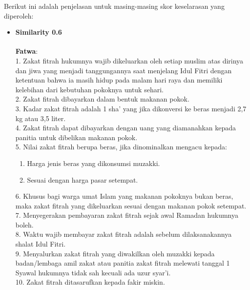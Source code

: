 \documentclass[12pt,a4paper]{article}
\begin{document}
Berikut ini adalah penjelasan untuk masing-masing skor keselarasan yang diperoleh:

\begin{itemize}
    \item \textbf{Similarity 0.6} \\ \\
        \textbf{Fatwa}: \\
        1. Zakat fitrah hukumnya wajib dikeluarkan oleh setiap muslim atas dirinya dan jiwa yang menjadi tanggungannya saat menjelang Idul Fitri dengan ketentuan bahwa ia masih hidup pada malam hari raya dan memiliki kelebihan dari kebutuhan pokoknya untuk sehari. \\
        2. Zakat fitrah dibayarkan dalam bentuk makanan pokok. \\
        3. Kadar zakat fitrah adalah 1 sha' yang jika dikonversi ke beras menjadi 2,7 kg atau 3,5 liter. \\
        4. Zakat fitrah dapat dibayarkan dengan uang yang diamanahkan kepada panitia untuk dibelikan makanan pokok. \\
        5. Nilai zakat fitrah berupa beras, jika dinominalkan mengacu kepada:
        \begin{enumerate}[label=\alph*)]
            \item Harga jenis beras yang dikonsumsi muzakki.
            \item Sesuai dengan harga pasar setempat.
        \end{enumerate}
        6. Khusus bagi warga umat Islam yang makanan pokoknya bukan beras, maka zakat fitrah yang dikeluarkan sesuai dengan makanan pokok setempat. \\
        7. Menyegerakan pembayaran zakat fitrah sejak awal Ramadan hukumnya boleh. \\
        8. Waktu wajib membayar zakat fitrah adalah sebelum dilaksanakannya shalat Idul Fitri. \\
        9. Menyalurkan zakat fitrah yang diwakilkan oleh muzakki kepada badan/lembaga amil zakat atau panitia zakat fitrah melewati tanggal 1 Syawal hukumnya tidak sah kecuali ada uzur syar'i. \\
        10. Zakat fitrah ditasarufkan kepada fakir miskin. \\


\end{itemize}
\end{document}
